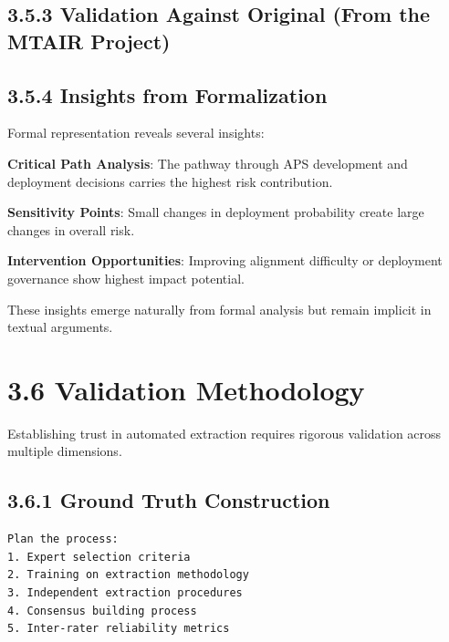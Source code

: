 \documentclass[
  11pt,
  letterpaper,
]{book}
\begin{document}
\subsection*{3.5.3 Validation Against Original (From the MTAIR
Project)}\label{sec-carlsmith-validation}

\subsection*{3.5.4 Insights from
Formalization}\label{sec-carlsmith-insights}

Formal representation reveals several insights:

\textbf{Critical Path Analysis}: The pathway through APS development and
deployment decisions carries the highest risk contribution.

\textbf{Sensitivity Points}: Small changes in deployment probability
create large changes in overall risk.

\textbf{Intervention Opportunities}: Improving alignment difficulty or
deployment governance show highest impact potential.

These insights emerge naturally from formal analysis but remain implicit
in textual arguments.

\section*{3.6 Validation Methodology}\label{sec-validation-methodology}


Establishing trust in automated extraction requires rigorous validation
across multiple dimensions.

\subsection*{3.6.1 Ground Truth Construction}\label{sec-ground-truth}

\begin{verbatim}
Plan the process:
1. Expert selection criteria
2. Training on extraction methodology
3. Independent extraction procedures
4. Consensus building process
5. Inter-rater reliability metrics
\end{verbatim}
\end{document}
